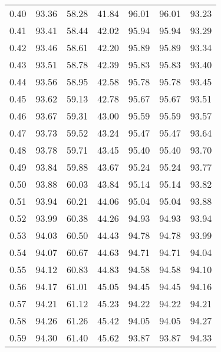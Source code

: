 \begin{tabular}{|c|c|c|c|c|c|c|}
      0.40 &     93.36 &     58.28 &      41.84 &   96.01 &      96.01 &         93.23 \\
      0.41 &     93.41 &     58.44 &      42.02 &   95.94 &      95.94 &         93.29 \\
      0.42 &     93.46 &     58.61 &      42.20 &   95.89 &      95.89 &         93.34 \\
      0.43 &     93.51 &     58.78 &      42.39 &   95.83 &      95.83 &         93.40 \\
      0.44 &     93.56 &     58.95 &      42.58 &   95.78 &      95.78 &         93.45 \\
      0.45 &     93.62 &     59.13 &      42.78 &   95.67 &      95.67 &         93.51 \\
      0.46 &     93.67 &     59.31 &      43.00 &   95.59 &      95.59 &         93.57 \\
      0.47 &     93.73 &     59.52 &      43.24 &   95.47 &      95.47 &         93.64 \\
      0.48 &     93.78 &     59.71 &      43.45 &   95.40 &      95.40 &         93.70 \\
      0.49 &     93.84 &     59.88 &      43.67 &   95.24 &      95.24 &         93.77 \\
      0.50 &     93.88 &     60.03 &      43.84 &   95.14 &      95.14 &         93.82 \\
      0.51 &     93.94 &     60.21 &      44.06 &   95.04 &      95.04 &         93.88 \\
      0.52 &     93.99 &     60.38 &      44.26 &   94.93 &      94.93 &         93.94 \\
      0.53 &     94.03 &     60.50 &      44.43 &   94.78 &      94.78 &         93.99 \\
      0.54 &     94.07 &     60.67 &      44.63 &   94.71 &      94.71 &         94.04 \\
      0.55 &     94.12 &     60.83 &      44.83 &   94.58 &      94.58 &         94.10 \\
      0.56 &     94.17 &     61.01 &      45.05 &   94.45 &      94.45 &         94.16 \\
      0.57 &     94.21 &     61.12 &      45.23 &   94.22 &      94.22 &         94.21 \\
      0.58 &     94.26 &     61.26 &      45.42 &   94.05 &      94.05 &         94.27 \\
      0.59 &     94.30 &     61.40 &      45.62 &   93.87 &      93.87 &         94.33 \\

\end{tabular}
